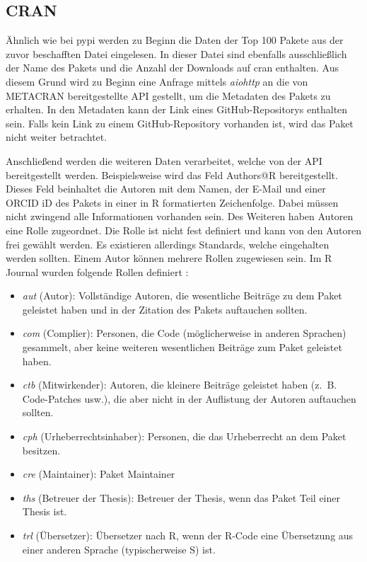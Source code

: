 \subsection{CRAN}
\label{subsec:datenbeschaffung_cran}
Ähnlich wie bei \gls{pypi} werden zu Beginn die Daten der Top 100 Pakete aus der zuvor beschafften Datei eingelesen.
In dieser Datei sind ebenfalls ausschließlich der Name des Pakets und die Anzahl der Downloads auf \gls{cran} enthalten.
Aus diesem Grund wird zu Beginn eine Anfrage mittels \emph{aiohttp} an die von METACRAN bereitgestellte API gestellt, um die Metadaten des Pakets zu erhalten.
In den Metadaten kann der Link eines GitHub-Repositorys enthalten sein.
Falls kein Link zu einem GitHub-Repository vorhanden ist, wird das Paket nicht weiter betrachtet.

Anschließend werden die weiteren Daten verarbeitet, welche von der API bereitgestellt werden.
Beispielsweise wird das Feld \glqq Authors@R\grqq{} bereitgestellt.
Dieses Feld beinhaltet die Autoren mit dem Namen, der E-Mail und einer ORCID iD des Pakets in einer in R formatierten Zeichenfolge.
Dabei müssen nicht zwingend alle Informationen vorhanden sein.
Des Weiteren haben Autoren eine Rolle zugeordnet.
Die Rolle ist nicht fest definiert und kann von den Autoren frei gewählt werden.
Es existieren allerdings Standards, welche eingehalten werden sollten.
Einem Autor können mehrere Rollen zugewiesen sein.
Im R Journal wurden folgende Rollen definiert \autocite{hornik_who_2011}:

\begin{itemize}
    \item \glqq \emph{aut}\grqq{} (Autor): Vollständige Autoren, die wesentliche Beiträge zu dem Paket geleistet haben und in der Zitation des Pakets auftauchen sollten.
    \item \glqq \emph{com}\grqq{} (Complier): Personen, die Code (möglicherweise in anderen Sprachen) gesammelt, aber keine weiteren wesentlichen Beiträge zum Paket geleistet haben.
    \item \glqq \emph{ctb}\grqq{} (Mitwirkender): Autoren, die kleinere Beiträge geleistet haben (z. B. Code-Patches usw.), die aber nicht in der Auflistung der Autoren auftauchen sollten.
    \item \glqq \emph{cph}\grqq{} (Urheberrechtsinhaber): Personen, die das Urheberrecht an dem Paket besitzen.
    \item \glqq \emph{cre}\grqq{} (Maintainer): Paket Maintainer
    \item \glqq \emph{ths}\grqq{} (Betreuer der Thesis): Betreuer der Thesis, wenn das Paket Teil einer Thesis ist.
    \item \glqq \emph{trl}\grqq{} (Übersetzer): Übersetzer nach R, wenn der R-Code eine Übersetzung aus einer anderen Sprache (typischerweise S) ist.
\end{itemize}

